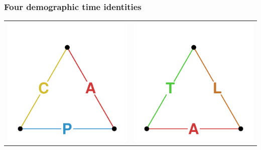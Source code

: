 \documentclass[20pt]{beamer}
\begin{document}

\begin{frame}
\frametitle{Four demographic time identities}
\vspace{-4em}
\begin{center}
\begin{tabular}{c c}
     \includegraphics[scale=.8]{Figures/APCid.pdf} &
     \includegraphics[scale=.8]{Figures/TALid.pdf} \\

\end{tabular}
\end{center}
\end{frame}
\end{document}
